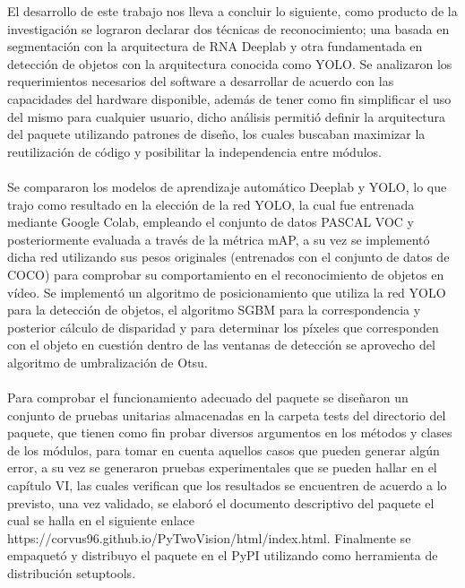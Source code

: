 El desarrollo de este trabajo nos lleva a concluir lo siguiente, como producto de la investigación se lograron declarar dos técnicas de reconocimiento; una basada en segmentación con la arquitectura de RNA Deeplab y otra fundamentada en detección de objetos con la arquitectura conocida como YOLO. Se analizaron los requerimientos necesarios del software a desarrollar de acuerdo con las capacidades del hardware disponible, además de tener como fin simplificar el uso del mismo para cualquier usuario, dicho análisis permitió definir la arquitectura del paquete utilizando patrones de diseño, los cuales buscaban maximizar la reutilización de código y posibilitar la independencia entre módulos.
\\
\\
Se compararon los modelos de aprendizaje automático Deeplab y YOLO, lo que trajo como resultado en la elección de la red YOLO, la cual fue entrenada mediante Google Colab, empleando el conjunto de datos PASCAL VOC y posteriormente evaluada a través de la métrica mAP, a su vez se implementó dicha red utilizando sus pesos originales (entrenados con el conjunto de datos de COCO) para comprobar su comportamiento en el reconocimiento de objetos en vídeo. Se implementó un algoritmo de posicionamiento que utiliza la red YOLO para la detección de objetos, el algoritmo SGBM para la correspondencia y posterior cálculo de disparidad y para determinar los píxeles que corresponden con el objeto en cuestión dentro de las ventanas de detección se aprovecho del algoritmo de umbralización de Otsu.
\\
\\
Para comprobar el funcionamiento adecuado del paquete se diseñaron un conjunto de pruebas unitarias almacenadas en la carpeta tests del directorio del paquete, que tienen como fin probar diversos argumentos en los métodos y clases de los módulos, para tomar en cuenta aquellos casos que pueden generar algún error, a su vez se generaron pruebas experimentales que se pueden hallar en el capítulo VI, las cuales verifican que los resultados se encuentren de acuerdo a lo previsto, una vez validado, se elaboró el documento descriptivo del paquete el cual se halla en el siguiente enlace https://corvus96.github.io/PyTwoVision/html/index.html. Finalmente se empaquetó y distribuyo el paquete en el PyPI utilizando como herramienta de distribución setuptools.